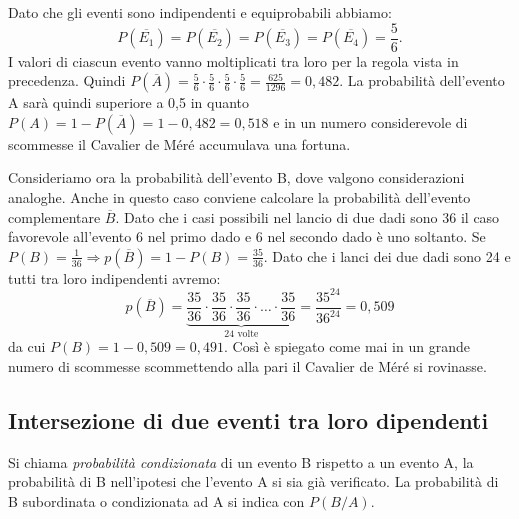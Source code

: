 Dato che gli eventi sono indipendenti e equiprobabili abbiamo: \[ 
P(\overline{E_1})=P(\overline{E_2})=P(\overline{E_3})=P(\overline{E_4})=\frac 
5 
6. \]
I valori di ciascun evento vanno moltiplicati tra loro per la regola vista in 
precedenza. Quindi $P(\overline A)=\frac 5 6\cdot \frac 5 6\cdot \frac 5 
6\cdot 
\frac 5 6=\frac{625}{1296}=0,482$.
La probabilità dell'evento A sarà quindi superiore a 0,5 in quanto 
$P(A)=1-P(\overline A)=1-0,482=0,518$ e in un numero considerevole di 
scommesse 
il Cavalier de Méré accumulava una fortuna.

Consideriamo ora la probabilità dell'evento B, dove valgono considerazioni 
analoghe. Anche in questo caso conviene calcolare la probabilità dell'evento 
complementare $\overline B$. Dato che i casi possibili nel lancio di due dadi 
sono 36 il caso favorevole all'evento 6 nel primo dado e 6 nel secondo dado è 
uno soltanto. Se $P(B)=\frac 1{36} \Rightarrow p(\overline 
B)=1-P(B)=\frac{35}{36}$. Dato che i lanci dei due dadi sono 24 e tutti tra 
loro 
indipendenti avremo:
 \[ p(\overline 
B)=\underbrace{\frac{35}{36}\cdot\frac{35}{36}\cdot\frac{35}{36}
\cdot\ldots\cdot\frac{35}{36}}_{24\text{ 
volte}}=\frac{35^{24}}{36^{24}}=0,509 
\]
 da cui $P(B)=1-0,509=0,491$. Così è spiegato come mai in un grande numero di 
scommesse scommettendo alla pari il Cavalier de Méré si rovinasse.


\subsection{Intersezione di due eventi tra loro dipendenti}
\begin{definizione}
Si chiama \emph{probabilità condizionata} di un evento B rispetto a un evento 
A, 
la probabilità di B nell'ipotesi che l'evento A si sia già verificato. La 
probabilità di B subordinata o condizionata ad A si indica con $P(B/A)$.
\end{definizione}

